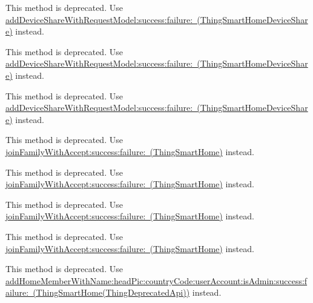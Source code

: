 \begin{DoxyRefList}
\label{deprecated__deprecated000071}%
%
This method is deprecated. Use \mbox{\hyperlink{interface_thing_smart_home_device_share_afbebb1c8fe1f3a71b4b476c1e1dd62ac}{add\+Device\+Share\+With\+Request\+Model\+:success\+:failure\+: (\+Thing\+Smart\+Home\+Device\+Share)}} instead. 

\label{deprecated__deprecated000017}%
%
This method is deprecated. Use \mbox{\hyperlink{interface_thing_smart_home_device_share_afbebb1c8fe1f3a71b4b476c1e1dd62ac}{add\+Device\+Share\+With\+Request\+Model\+:success\+:failure\+: (\+Thing\+Smart\+Home\+Device\+Share)}} instead. 

\label{deprecated__deprecated000035}%
%
This method is deprecated. Use \mbox{\hyperlink{interface_thing_smart_home_device_share_afbebb1c8fe1f3a71b4b476c1e1dd62ac}{add\+Device\+Share\+With\+Request\+Model\+:success\+:failure\+: (\+Thing\+Smart\+Home\+Device\+Share)}} instead.  
\item[Member \mbox{\hyperlink{interface_thing_smart_home_manager_a918b1c1cc597ea22b77f971954ba6627}{\mbox{[}Thing\+Smart\+Home\+Manager join\+Family\+With\+Home\+Id\+:action\+:success\+:failure\+:\mbox{]}}} ]\label{deprecated__deprecated000039}%
%
This method is deprecated. Use \mbox{\hyperlink{interface_thing_smart_home_a88731b78e47ae114abe330b7d1b399b8}{join\+Family\+With\+Accept\+:success\+:failure\+: (\+Thing\+Smart\+Home)}} instead. 

\label{deprecated__deprecated000003}%
%
This method is deprecated. Use \mbox{\hyperlink{interface_thing_smart_home_a88731b78e47ae114abe330b7d1b399b8}{join\+Family\+With\+Accept\+:success\+:failure\+: (\+Thing\+Smart\+Home)}} instead. 

\label{deprecated__deprecated000057}%
%
This method is deprecated. Use \mbox{\hyperlink{interface_thing_smart_home_a88731b78e47ae114abe330b7d1b399b8}{join\+Family\+With\+Accept\+:success\+:failure\+: (\+Thing\+Smart\+Home)}} instead. 

\label{deprecated__deprecated000021}%
%
This method is deprecated. Use \mbox{\hyperlink{interface_thing_smart_home_a88731b78e47ae114abe330b7d1b399b8}{join\+Family\+With\+Accept\+:success\+:failure\+: (\+Thing\+Smart\+Home)}} instead.  
\item[(Thing\+Deprecated\+Api) Member \mbox{\hyperlink{category_thing_smart_home_member_07_thing_deprecated_api_08_aafb153b4efd6dd5350e9c7244418a845}{\mbox{[}Thing\+Smart\+Home\+Member(Thing\+Deprecated\+Api) add\+Home\+Member\+With\+Home\+Id\+:country\+Code\+:account\+:name\+:is\+Admin\+:success\+:failure\+:\mbox{]}}} ]\label{deprecated__deprecated000027}%
%
This method is deprecated. Use \mbox{\hyperlink{category_thing_smart_home_07_thing_deprecated_api_08_aa06ed0850cb14733eb33f539a81e0650}{add\+Home\+Member\+With\+Name\+:head\+Pic\+:country\+Code\+:user\+Account\+:is\+Admin\+:success\+:failure\+: (\+Thing\+Smart\+Home(\+Thing\+Deprecated\+Api))}} instead. 


\end{DoxyRefList}
